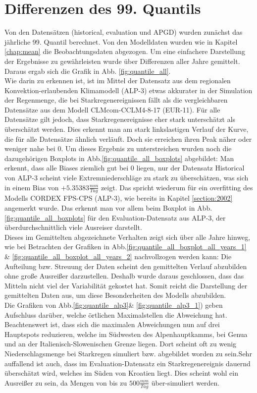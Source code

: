 \section{Differenzen des 99. Quantils}
Von den Datensätzen (historical, evaluation und APGD) wurden zunächst das jährliche 99. Quantil berechnet. Von den Modelldaten wurden wie in Kapitel \ref{chap:mean} die Beobachtungsdaten abgezogen. Um eine einfachere Darstellung der Ergebnisse zu gewährleisten wurde über Differenzen aller Jahre gemittelt. Daraus ergab sich die Grafik in Abb. \ref{fig:quantile_all}. \\
Wie darin zu erkennen ist, ist im Mittel der Datensatz aus dem regionalen Konvektion-erlaubenden Klimamodell (ALP-3) etwas akkurater in der Simulation der Regenmenge, die bei Starkregenereignissen fällt als die vergleichbaren Datensätze aus dem Modell CLMcom-CCLM4-8-17 (EUR-11). Für alle Datensätze gilt jedoch, dass Starkregenereignisse eher stark unterschätzt als überschätzt werden. Dies erkennt man am stark linkslastigen Verlauf der Kurve, die für alle Datensätze ähnlich verläuft. Doch sie erreichen ihren Peak näher oder weniger nahe bei $0$. Um dieses Ergebnis zu unterstreichen wurden noch die dazugehörigen Boxplots in Abb.\ref{fig:quantile_all_boxplots} abgebildet: Man erkennt, dass alle Biases ziemlich gut bei $0$ liegen, nur der Datensatz Historical von ALP-3 scheint viele Extremniederschläge zu stark zu überschätzen, was sich in einem Bias von $+5.35383 \frac{mm}{Tag}$ zeigt. Das spricht wiederum für ein overfitting des Modells CORDEX FPS-CPS (ALP-3), wie bereits in Kapitel \ref{section:2002} angemerkt wurde. Das erkennt man vor allem beim Boxplot in Abb.\ref{fig:quantile_all_boxplots} für den Evaluation-Datensatz aus ALP-3, der überdurchschnittlich viele Ausreiser darstellt. \\
Dieses im Gemittelten abgezeichnete Verhalten zeigt sich über alle Jahre hinweg, wie bei Betrachten der Grafiken in Abb.\ref{fig:quantile_all_boxplot_all_years_1} \& \ref{fig:quantile_all_boxplot_all_years_2} nachvollzogen werden kann: Die Aufteilung bzw. Streuung der Daten scheint den gemittelten Verlauf abzubilden ohne große Ausreißer darzustellen. Deshalb wurde daraus geschlossen, dass das Mitteln nicht viel der Variabilität gekostet hat. Somit reicht die Darstellung der gemittelten Daten aus, um diese Besonderheiten des Modells abzubilden.\\
Die Grafiken von Abb.\ref{fig:quantile_alp3}\& \ref{fig:quantile_alp3_1}) geben Aufschluss darüber, welche örtlichen Maximalstellen die Abweichung hat. Beachtenswert ist, dass sich die maximalen Abweichungen nun auf drei Hauptspots reduzieren, welche im Südwesten des Alpenhauptkamms, bei Genua und an der Italienisch-Slowenischen Grenze liegen. Dort scheint oft zu wenig Niederschlagsmenge bei Starkregen simuliert bzw. abgebildet worden zu sein.Sehr auffallend ist auch, dass im Evaluation-Datensatz ein Starkregenereignis dauernd überschätzt wird, welches im Süden von Kroatien liegt. Dies scheint wohl ein Ausreißer zu sein, da Mengen von bis zu $500 \frac{mm}{Tag}$ über-simuliert werden.\\
